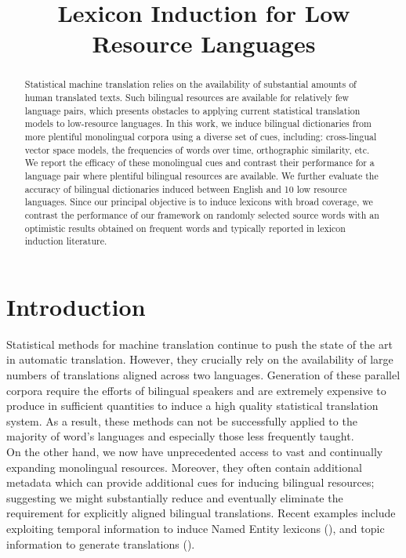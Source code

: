 \documentclass{article}
\title{Lexicon Induction for Low Resource Languages}
\begin{document}
\maketitle

\begin{abstract}

Statistical machine translation relies on the availability of substantial amounts of human translated texts. Such bilingual resources are available for relatively few language pairs, which presents obstacles to applying current statistical translation models to low-resource languages. In this work, we induce bilingual dictionaries from more plentiful monolingual corpora using a diverse set of cues, including: cross-lingual vector space models, the frequencies of words over time, orthographic similarity, etc.  We report the efficacy of these monolingual cues and contrast their performance for a language pair where plentiful bilingual resources are available.  We further evaluate the accuracy of bilingual dictionaries induced between English and 10 low resource languages.  Since our principal objective is to induce lexicons with broad coverage, we contrast the performance of our framework on randomly selected source words with an optimistic results obtained on frequent words and typically reported in lexicon induction literature. 

\end{abstract}

\section{Introduction}

Statistical methods for machine translation continue to push the state of the art in automatic translation. However, they crucially rely on the availability of large numbers of translations aligned across two languages. Generation of these parallel corpora require the efforts of bilingual speakers and are extremely expensive to produce in sufficient quantities to induce a high quality statistical translation system. As a result, these methods can not be successfully applied to the majority of word's languages and especially those less frequently taught.
\\

On the other hand, we now have unprecedented access to vast and continually expanding monolingual resources. Moreover, they often contain additional metadata which can provide additional cues for inducing bilingual resources; suggesting we might substantially reduce and eventually eliminate the requirement for explicitly aligned bilingual translations. Recent examples include exploiting temporal information to induce Named Entity lexicons (\cite{Schafer:2002,Klementiev:2006b}), and topic information to generate translations (\cite{Mimno:2009}). \\
\end{document}
